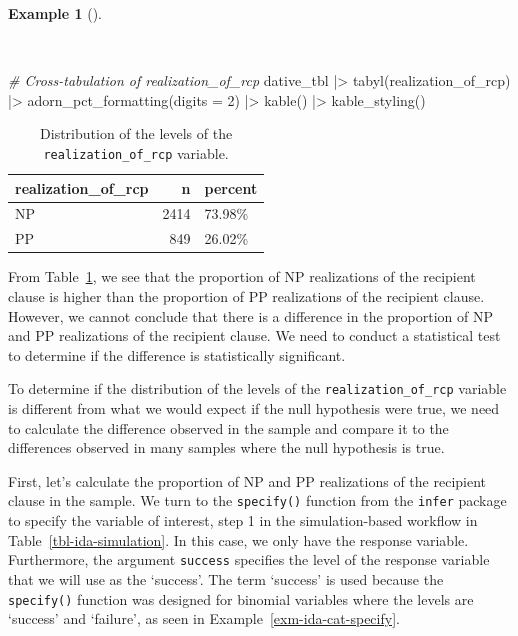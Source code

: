 \documentclass[
  letterpaper,
]{latex/krantz}
\newenvironment{Shaded}{\begin{snugshade}}{\end{snugshade}}
\newcommand{\AttributeTok}[1]{\textcolor[rgb]{0.00,0.00,0.00}{#1}}
\newcommand{\CommentTok}[1]{\textcolor[rgb]{0.00,0.00,0.00}{\textit{#1}}}
\newcommand{\DecValTok}[1]{\textcolor[rgb]{0.00,0.00,0.00}{#1}}
\newcommand{\FunctionTok}[1]{\textcolor[rgb]{0.00,0.00,0.00}{#1}}
\newcommand{\NormalTok}[1]{\textcolor[rgb]{0.00,0.00,0.00}{#1}}
\newcommand{\SpecialCharTok}[1]{\textcolor[rgb]{0.00,0.00,0.00}{#1}}
\theoremstyle{definition}
\newtheorem{example}{Example}[chapter]
\theoremstyle{remark}
\begin{document}
\begin{example}[]\protect\hypertarget{exm-ida-cat-univariate-tbl}{}\label{exm-ida-cat-univariate-tbl}

~

\begin{Shaded}
\begin{Highlighting}[]
\CommentTok{\# Cross{-}tabulation of \textasciigrave{}realization\_of\_rcp\textasciigrave{}}
\NormalTok{dative\_tbl }\SpecialCharTok{|\textgreater{}}
  \FunctionTok{tabyl}\NormalTok{(realization\_of\_rcp) }\SpecialCharTok{|\textgreater{}}
  \FunctionTok{adorn\_pct\_formatting}\NormalTok{(}\AttributeTok{digits =} \DecValTok{2}\NormalTok{) }\SpecialCharTok{|\textgreater{}}
  \FunctionTok{kable}\NormalTok{() }\SpecialCharTok{|\textgreater{}}
  \FunctionTok{kable\_styling}\NormalTok{()}
\end{Highlighting}
\end{Shaded}

\begin{longtable}[t]{lrl}

\caption{\label{tbl-ida-cat-univariate}Distribution of the levels of the
\texttt{realization\_of\_rcp} variable.}

\tabularnewline

\toprule
realization\_of\_rcp & n & percent\\
\midrule
NP & 2414 & 73.98\%\\
PP & 849 & 26.02\%\\
\bottomrule

\end{longtable}

\end{example}

From Table~\ref{tbl-ida-cat-univariate}, we see that the proportion of
NP realizations of the recipient clause is higher than the proportion of
PP realizations of the recipient clause. However, we cannot conclude
that there is a difference in the proportion of NP and PP realizations
of the recipient clause. We need to conduct a statistical test to
determine if the difference is statistically significant.

To determine if the distribution of the levels of the
\texttt{realization\_of\_rcp} variable is different from what we would
expect if the null hypothesis were true, we need to calculate the
difference observed in the sample and compare it to the differences
observed in many samples where the null hypothesis is true.

First, let's calculate the proportion of NP and PP realizations of the
recipient clause in the sample. We turn to the \texttt{specify()}
function from the \texttt{infer} package to specify the variable of
interest, step 1 in the simulation-based workflow in
Table~\ref{tbl-ida-simulation}. In this case, we only have the response
variable. Furthermore, the argument \texttt{success} specifies the level
of the response variable that we will use as the `success'. The term
`success' is used because the \texttt{specify()} function was designed
for binomial variables where the levels are `success' and `failure', as
seen in Example~\ref{exm-ida-cat-specify}.
\end{document}
